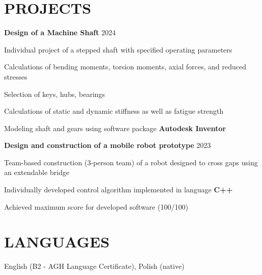 \documentclass[a4paper,10pt]{extarticle}
\begin{document}
\vspace{-0.1cm}

\section* {PROJECTS}

\vspace{-0.1cm}

{\noindent}\textbf {Design of a Machine Shaft} {\hfill}2024
\vspace{-0.2cm}
\begin {itemize}
{\item Individual project of a stepped shaft with specified operating parameters }
{\item Calculations of bending moments, torsion moments, axial forces, and reduced stresses }
{\item Selection of keys, hubs, bearings }
{\item Calculations of static and dynamic stiffness as well as fatigue strength }
{\item Modeling shaft and gears using software package {\textbf {Autodesk Inventor}} }
\end {itemize}

{\vspace {-0.1cm}}
{\noindent}\textbf {Design and construction of a mobile robot prototype } {\hfill}2023
{\vspace {-0.2cm}}
\begin {itemize}
{\item Team-based construction (3-person team) of a robot designed to cross gaps using an extendable bridge }
{\item Individually developed control algorithm implemented in language {\textbf {C++}} }
{\item Achieved maximum score for developed software (100/100) }
\end {itemize}

{\vspace {-0.1cm}}

{\section * {LANGUAGES }}
English (B2 - AGH Language Certificate), Polish (native)

{\renewcommand {\thefootnote } {} }
{}
\end{document}
